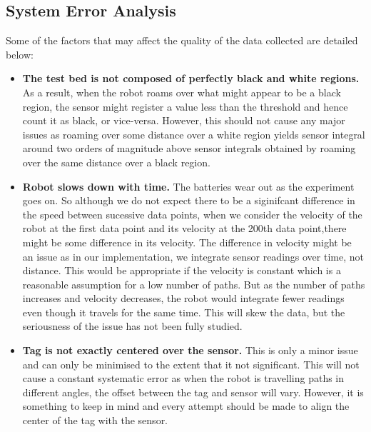 \documentclass[english]{article}\usepackage[]{graphicx}\usepackage[]{color}
\begin{document}

\subsection{System Error Analysis}

Some of the factors that may affect the quality of the data collected are detailed below:
\begin{itemize}
\item \textbf{The test bed is not composed of perfectly black and white regions.} As a result, when the robot roams over what might appear to be a black region, the sensor might register a value less than the threshold and hence count it as black, or vice-versa. However, this should not cause any major issues as roaming over some distance over a white region yields sensor integral around two orders of magnitude above sensor integrals obtained by roaming over the same distance over a black region.
\item \textbf{Robot slows down with time.} The batteries wear out as the experiment goes on. So although we do not expect there to be a siginifcant difference in the speed between sucessive data points, when we consider the velocity of the robot at the first data point and its velocity at the 200th data point,there might be some difference in its velocity. The difference in velocity might be an issue as in our implementation, we integrate sensor readings over time, not distance. This would be appropriate if the velocity is constant which is a reasonable assumption for a low number of paths. But as the number of paths increases and velocity decreases, the robot would integrate fewer readings even though it travels for the same time. This will skew the data, but the seriousness of the issue has not been fully studied.
\item \textbf{Tag is not exactly centered over the sensor.} This is only a minor issue and can only be minimised to the extent that it not significant. This will not cause a constant systematic error as when the robot is travelling paths in different angles, the offset between the tag and sensor will vary. However, it is something to keep in mind and every attempt should be made to align the center of the tag with the sensor.
\end{itemize}
\end{document}
